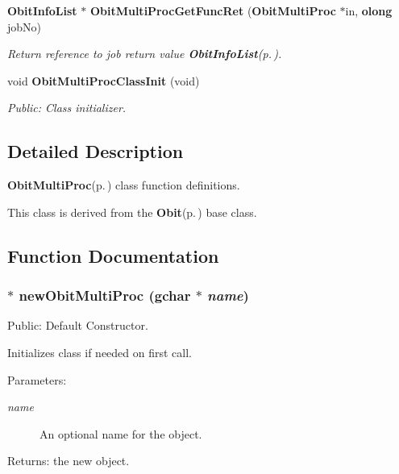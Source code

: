 \begin{CompactItemize}
{\bf Obit\-Info\-List} $\ast$ {\bf Obit\-Multi\-Proc\-Get\-Func\-Ret} ({\bf Obit\-Multi\-Proc} $\ast$in, {\bf olong} job\-No)
\begin{CompactList}\small\item\em Return reference to job return value {\bf Obit\-Info\-List}{\rm (p.\,\pageref{structObitInfoList})}. \item\end{CompactList}\item 
void {\bf Obit\-Multi\-Proc\-Class\-Init} (void)
\begin{CompactList}\small\item\em Public: Class initializer. \item\end{CompactList}\end{CompactItemize}


\subsection{Detailed Description}
{\bf Obit\-Multi\-Proc}{\rm (p.\,\pageref{structObitMultiProc})} class function definitions. 

This class is derived from the {\bf Obit}{\rm (p.\,\pageref{structObit})} base class.

\subsection{Function Documentation}
\subsubsection{$\ast$ new\-Obit\-Multi\-Proc (gchar $\ast$ {\em name})}\label{ObitMultiProc_8c_a11}


Public: Default Constructor. 

Initializes class if needed on first call. \begin{Desc}
\item[Parameters:]
\begin{description}
\item[{\em name}]An optional name for the object. \end{description}
\end{Desc}
\begin{Desc}
\item[Returns:]the new object. \end{Desc}
